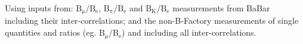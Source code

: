 \noindent Using inputs from: $\mathrm{B_\mu/B_e}$,  $\mathrm{B_\pi/B_e}$ and $\mathrm{B_K/B_e}$ measurements from BaBar including their inter-correlations; and the non-B-Factory measurements of single quantities and ratios (eg. $\mathrm{B_\mu/B_e}$) and including all inter-correlations.
